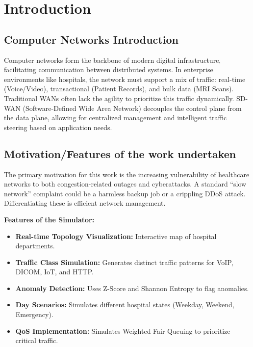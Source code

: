 \documentclass[12pt]{report}
\begin{document}
\chapter{Introduction}

\section{Computer Networks Introduction}
Computer networks form the backbone of modern digital infrastructure, facilitating communication between distributed systems. In enterprise environments like hospitals, the network must support a mix of traffic: real-time (Voice/Video), transactional (Patient Records), and bulk data (MRI Scans). Traditional WANs often lack the agility to prioritize this traffic dynamically. SD-WAN (Software-Defined Wide Area Network) decouples the control plane from the data plane, allowing for centralized management and intelligent traffic steering based on application needs.

\section{Motivation/Features of the work undertaken}
The primary motivation for this work is the increasing vulnerability of healthcare networks to both congestion-related outages and cyberattacks. A standard ``slow network'' complaint could be a harmless backup job or a crippling DDoS attack. Differentiating these is efficient network management.

\textbf{Features of the Simulator:}
\begin{itemize}
    \item \textbf{Real-time Topology Visualization:} Interactive map of hospital departments.
    \item \textbf{Traffic Class Simulation:} Generates distinct traffic patterns for VoIP, DICOM, IoT, and HTTP.
    \item \textbf{Anomaly Detection:} Uses Z-Score and Shannon Entropy to flag anomalies.
    \item \textbf{Day Scenarios:} Simulates different hospital states (Weekday, Weekend, Emergency).
    \item \textbf{QoS Implementation:} Simulates Weighted Fair Queuing to prioritize critical traffic.
\end{itemize}
\end{document}

